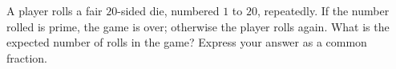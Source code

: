 A player rolls a fair $20$-sided die, numbered $1$ to $20$, repeatedly. If the number rolled is prime, the game is over; otherwise the player rolls again. What is the expected number of rolls in the game? Express your answer as a common fraction.
